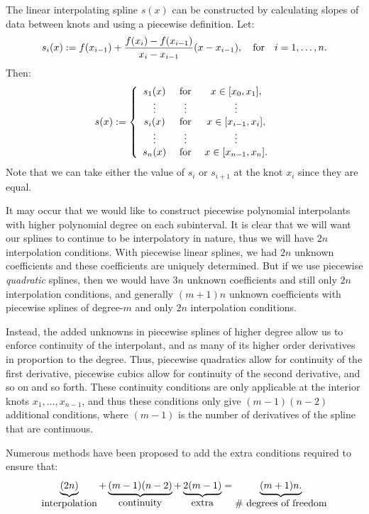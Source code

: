 The linear interpolating spline $s(x)$ can be constructed by calculating slopes of data between knots and using a piecewise definition. Let:
\[
s_i(x) := f(x_{i-1}) + \dfrac{f(x_i)-f(x_{i-1})}{x_i-x_{i-1}}(x-x_{i-1}),\quad{\rm for}\quad i=1,\ldots,n.
\]
Then:
\[
s(x) := \left\{ \begin{array}{ccc}
s_1(x) & \hbox{ for } & x\in[x_0,x_1],\\
\vdots & \vdots & \vdots\\
s_i(x) & \hbox{ for } & x\in[x_{i-1},x_i],\\
\vdots & \vdots & \vdots\\
s_n(x) & \hbox{ for } & x\in[x_{n-1},x_n].\\
\end{array}\right.
\]
Note that we can take either the value of $s_i$ or $s_{i+1}$ at the knot $x_i$ since they are equal.

It may occur that we would like to construct piecewise polynomial interpolants with higher polynomial degree on each subinterval. It is clear that we will want our splines to continue to be interpolatory in nature, thus we will have $2n$ interpolation conditions. With piecewise linear splines, we had $2n$ unknown coefficients and these coefficients are uniquely determined. But if we use piecewise {\em quadratic} splines, then we would have $3n$ unknown coefficients and still only $2n$ interpolation conditions, and generally $(m+1)n$ unknown coefficients with piecewise splines of degree-$m$ and only $2n$ interpolation conditions.

Instead, the added unknowns in piecewise splines of higher degree allow us to enforce continuity of the interpolant, and as many of its higher order derivatives in proportion to the degree. Thus, piecewise quadratics allow for continuity of the first derivative, piecewise cubics allow for continuity of the second derivative, and so on and so forth. These continuity conditions are only applicable at the interior knots $x_1,\ldots,x_{n-1}$, and thus these conditions only give $(m-1)(n-2)$ additional conditions, where $(m-1)$ is the number of derivatives of the spline that are continuous.

Numerous methods have been proposed to add the extra conditions required to ensure that:
\[
\underbrace{(2n)}_{\hbox{interpolation}} + \underbrace{(m-1)(n-2)}_{\hbox{continuity}} + \underbrace{2(m-1)}_{\hbox{extra}} = \underbrace{(m+1)n.}_{\hbox{\# degrees of freedom}}
\]

